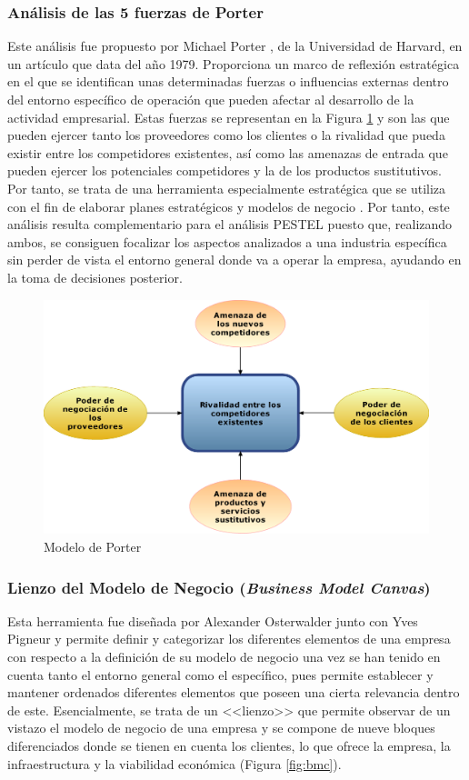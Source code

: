 \subsubsection{Análisis de las 5 fuerzas de Porter}
Este análisis fue propuesto por Michael Porter \cite{Porter1989HowStrategy}, de la Universidad de Harvard, en un artículo que data del año 1979. Proporciona un marco de reflexión estratégica en el que se identifican unas determinadas fuerzas o influencias externas dentro del entorno específico de operación que pueden afectar al desarrollo de la actividad empresarial. Estas fuerzas se representan en la Figura \ref{fig:fuerzas_porter} y son las que pueden ejercer tanto los proveedores como los clientes o la rivalidad que pueda existir entre los competidores existentes, así como las amenazas de entrada que pueden ejercer los potenciales competidores y la de los productos sustitutivos. Por tanto, se trata de una herramienta especialmente estratégica que se utiliza con el fin de elaborar planes estratégicos y modelos de negocio \cite{josemanuel}. Por tanto, este análisis resulta complementario para el análisis PESTEL puesto que, realizando ambos, se consiguen focalizar los aspectos analizados a una industria específica sin perder de vista el entorno general donde va a operar la empresa, ayudando en la toma de decisiones posterior.

\begin{figure}[h]
  \centering
  \includegraphics[width=0.75\linewidth]{figures/images/Modelo_Porter.png}
  \caption{Modelo de Porter}
  \label{fig:fuerzas_porter}
\end{figure}

\clearpage

\subsubsection{Lienzo del Modelo de Negocio (\textit{Business Model Canvas})}
Esta herramienta \cite{cristinaramosvega2018} fue diseñada por Alexander Osterwalder junto con Yves Pigneur y permite definir y categorizar los diferentes elementos de una empresa con respecto a la definición de su modelo de negocio una vez se han tenido en cuenta tanto el entorno general como el específico, pues permite establecer y mantener ordenados diferentes elementos que poseen una cierta relevancia dentro de este. Esencialmente, se trata de un <<lienzo>> que permite observar de un vistazo el modelo de negocio de una empresa y se compone de nueve bloques diferenciados donde se tienen en cuenta los clientes, lo que ofrece la empresa, la infraestructura y la viabilidad económica (Figura \ref{fig:bmc}).

